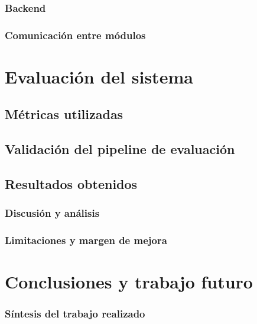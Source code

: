 \documentclass[a4paper,11pt]{memoir}
\begin{document}
\subsection{Backend}

\subsection{Comunicación entre módulos}

%
\chapter{Evaluación del sistema}

\section{Métricas utilizadas}

\section{Validación del pipeline de evaluación}

\section{Resultados obtenidos}

\subsection{Discusión y análisis}

\subsection{Limitaciones y margen de mejora}

\chapter{Conclusiones y trabajo futuro}
\subsection{Síntesis del trabajo realizado}

%
\end{document}
